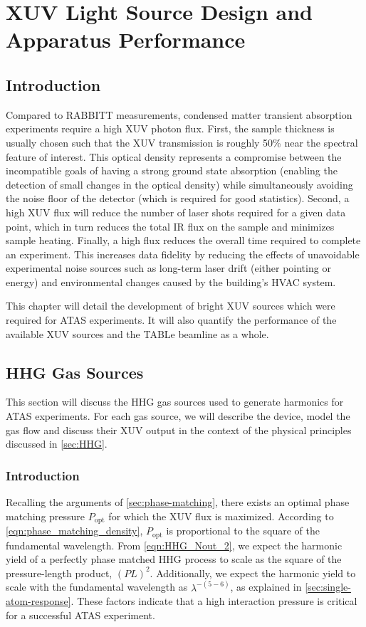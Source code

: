 \chapter{XUV Light Source Design and Apparatus Performance}

\section{Introduction}

Compared to RABBITT measurements, condensed matter transient absorption experiments require a high XUV photon flux. First, the sample thickness is usually chosen such that the XUV transmission is roughly 50\% near the spectral feature of interest. This optical density represents a compromise between the incompatible goals of having a strong ground state absorption (enabling the detection of small changes in the optical density) while simultaneously avoiding the noise floor of the detector (which is required for good statistics). Second, a high XUV flux will reduce the number of laser shots required for a given data point, which in turn reduces the total IR flux on the sample and minimizes sample heating. Finally, a high flux reduces the overall time required to complete an experiment. This increases data fidelity by reducing the effects of unavoidable experimental noise sources such as long-term laser drift (either pointing or energy) and environmental changes caused by the building's HVAC system.

This chapter will detail the development of bright XUV sources which were required for ATAS experiments. It will also quantify the performance of the available XUV sources and the TABLe beamline as a whole.

\section{HHG Gas Sources}
\label{sec:HHG_gas_sources}

This section will discuss the HHG gas sources used to generate harmonics for ATAS experiments. For each gas source, we will describe the device, model the gas flow and discuss their XUV output in the context of the physical principles discussed in \cref{sec:HHG}.

\subsection{Introduction}

Recalling the arguments of \cref{sec:phase-matching}, there exists an optimal phase matching pressure $P_{\textrm{opt}}$ for which the XUV flux is maximized. According to \cref{eqn:phase_matching_density}, $P_{\textrm{opt}}$ is proportional to the square of the fundamental wavelength. From \cref{eqn:HHG_Nout_2}, we expect the harmonic yield of a perfectly phase matched HHG process to scale as the square of the pressure-length product, $(PL)^2$. Additionally, we expect the harmonic yield to scale with the fundamental wavelength as $\lambda^{-(5-6)}$, as explained in \cref{sec:single-atom-response}. These factors indicate that a high interaction pressure is critical for a successful ATAS experiment.

